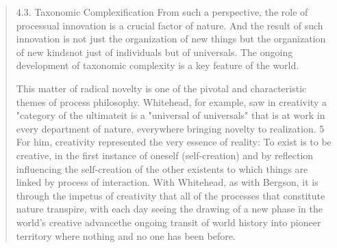 \documentclass[a4paper]{Thesis}
\begin{document}
	\begin{quotation}
		4.3. Taxonomic Complexification
		From such a perspective, the role of processual innovation is a crucial factor of nature.
		And the result of such innovation is not just the organization of new things but the
		organization of new kindsnot just of individuals but of universals. The ongoing
		development of taxonomic complexity is a key feature of the world.
		
		This matter of radical novelty is one of the pivotal and characteristic themes of process
		philosophy. Whitehead, for example, saw in creativity a "category of the ultimateit is a
		"universal of universals" that is at work in every department of nature, everywhere
		bringing novelty to realization. 5 For him, creativity represented the very essence of
		reality: To exist is to be creative, in the first instance of oneself (self-creation) and by
		reflection influencing the self-creation of the other existents to which things are linked by
		process of interaction. With Whitehead, as with Bergson, it is through the impetus of
		creativity that all of the processes that constitute nature transpire, with each day seeing
		the drawing of a new phase in the
		world's creative advancethe ongoing transit of world history into pioneer territory where
		nothing and no one has been before.
		

\end{quotation}
\end{document}
